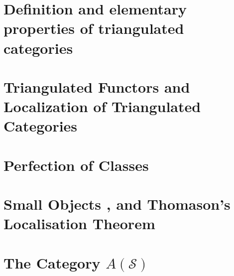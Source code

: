 \documentclass[Total.tex]{subfiles}
\begin{document}
	\chapter{Definition and elementary properties of triangulated categories}
	\chapter{Triangulated Functors and Localization of Triangulated Categories}
	\chapter{Perfection of Classes}
	\chapter{Small Objects , and Thomason's Localisation Theorem}
	\chapter{The Category $A(\mathcal{S})$}
\end{document}
